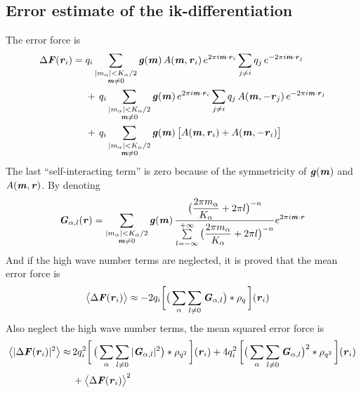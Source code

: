 \documentclass[aps,pre,preprint]{revtex4-1}
\renewcommand{\v}[1]{\textbf{\textit{#1}}}
\begin{document}
\subsection{Error estimate of the ik-differentiation}
The error force is 
\begin{align}\nonumber
  \Delta\v F(\v r_i)
  =\;&
  q_i
  \sum_{
    \begin{subarray}{c}
      \vert m_{\alpha}\vert < K_\alpha/2\\
      \v m\neq 0
    \end{subarray}}
  \v g(\v m)\,
  A(\v m, \v r_i)\,
  e^{2\pi i\v m\cdot \v r_i}
  \sum_{j\neq i}q_j\,e^{-2\pi i\v m\cdot\v r_j} \\\nonumber
  & +\,
  q_i
  \sum_{
    \begin{subarray}{c}
      \vert m_{\alpha}\vert < K_\alpha/2\\
      \v m\neq 0
    \end{subarray}}
  \v g(\v m)\,
  e^{2\pi i\v m\cdot \v r_i}
  \sum_{j\neq i}q_j\,A(\v m, -\v r_j)\,e^{-2\pi i\v m\cdot\v r_j}\\\nonumber
  & +\,
  q_i
  \sum_{
    \begin{subarray}{c}
      \vert m_{\alpha}\vert < K_\alpha/2\\
      \v m\neq 0
    \end{subarray}}
  \v g(\v m)\,
  \big[
  A(\v m, \v r_i) +
  A(\v m, -\v r_i)
  \big]
\end{align}
The last ``self-interacting term'' is zero because of the symmetricity
of $\v g(\v m)$ and $A(\v m, \v r)$. 
By denoting
\begin{align}
  \v G_{\alpha,l}(\v r) =
  \sum_{
    \begin{subarray}{c}
      \vert m_{\alpha}\vert < K_\alpha/2\\
      \v m\neq 0
    \end{subarray}}
  \v g(\v m)\,
  \frac
  {\big(\dfrac{2\pi m_\alpha}{K_\alpha} + 2\pi l\big)^{-n}}
  {\sum\limits_{l=-\infty}^{+\infty}
    \big(\dfrac{2\pi m_\alpha}{K_\alpha} + 2\pi l\big)^{-n}}
  e^{2\pi i\v m\cdot\v r}
\end{align}
And if the high wave number terms are neglected, it is proved that the
mean error force is
\begin{align}
  \big\langle
  \Delta\v F(\v r_i)
  \big\rangle
  & \approx
  - 2 q_i
  \bigg[
  \big(
  \sum_{\alpha}\sum_{l\neq 0}\v G_{\alpha,l}
  \big)
  \ast\rho_q\,
  \bigg] (\v r_i)
\end{align}
Also neglect the high wave number terms, the mean squared error force is 
\begin{align}\nonumber
  \big\langle
  \vert\Delta\v F(\v r_i)\vert^2
  \big\rangle
  \approx&\, 
  2q_i^2
  \bigg[\,
  \big(
  \sum_{\alpha} \sum_{l\neq 0}
  \vert \v G_{\alpha,l}\vert^2
  \big)
  \ast \rho_{q^2}
  \,\bigg] (\v r_i)
  +
  4q_i^2\,
  \bigg[
  \big(
  \sum_{\alpha} \sum_{l\neq 0}  
  \v G_{\alpha,l}
  \big)^2
  \ast \rho_{q^2}\,
  \bigg] (\v r_i) \\
  &\,+
  \big\langle
  \Delta\v F(\v r_i)
  \big\rangle  ^2
\end{align}
\end{document}
